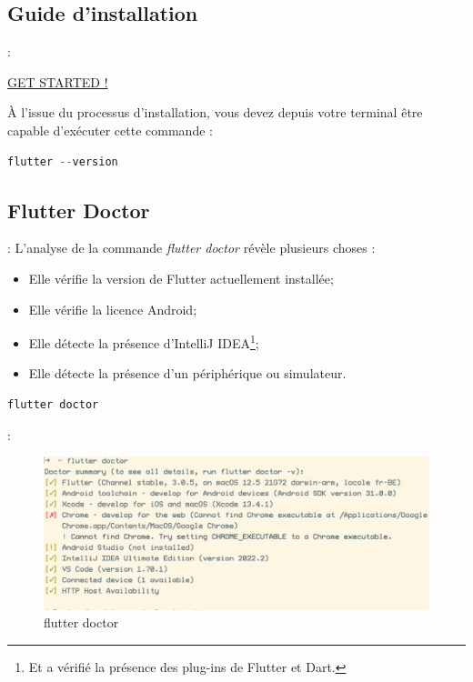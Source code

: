 \documentclass[10pt]{beamer}
\begin{document}
\subsection{Guide d'installation}
\begin{frame}[fragile,t]{\secname : \subsecname}
    \begin{center}
        \href{https://flutter.dev/docs/get-started/install}{GET STARTED !}
    \end{center}
    À l'issue du processus d'installation, vous devez depuis votre terminal être capable d’exécuter cette commande :
    \begin{lstlisting}[caption={Connaître la version de flutter},language=C, label=getversion]
    flutter --version
    \end{lstlisting}
\end{frame}

\subsection{Flutter Doctor}
\begin{frame}[fragile,t]{\secname : \subsecname}
    L’analyse de la commande \textit{flutter doctor} révèle plusieurs choses :
    \begin{itemize}
        \item Elle vérifie la version de Flutter actuellement installée;
        \item Elle vérifie la licence Android;
        \item Elle détecte la présence d’IntelliJ IDEA\footnote{Et a vérifié la présence des plug-ins de Flutter  et Dart.};
        \item Elle détecte la présence d'un périphérique ou simulateur.
    \end{itemize}
    \begin{lstlisting}[caption={Vérifier l'installation},language=bash, label=getversion]
        flutter doctor
        \end{lstlisting}
\end{frame}
\begin{frame}[fragile,t]{\secname : \subsecname}
    \begin{figure}[H]
        \begin{center}
            \includegraphics[width=\textwidth]{../assets/img/flutter-doctor.jpg}
            \caption*{flutter doctor}
        \end{center}
    \end{figure}
\end{frame}
\end{document}
